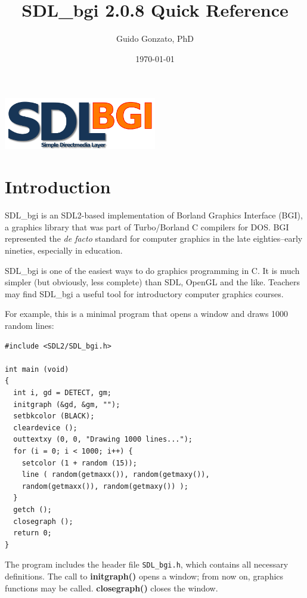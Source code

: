 \documentclass[a4paper,11pt]{article}
\newcommand{\SDLbgi}{SDL\_bgi}
\newcommand{\version}{2.0.8}        %
\newcommand{\func}[1]{\textbf{#1}}  %
\newcommand{\F}[1]{\texttt{#1}}     %
\begin{document}
\title{\SDLbgi{} \version{} Quick Reference}

\author{Guido Gonzato, PhD}

\date{\today}

\maketitle

\begin{center}
  \includegraphics[width=0.5\textwidth]{SDL_bgi_logo.png}  
\end{center}


\section{Introduction}

\SDLbgi{} is an SDL2-based implementation of Borland Graphics
Interface (BGI), a graphics library that was part of Turbo/Borland C
compilers for DOS. BGI represented the \emph{de facto} standard for
computer graphics in the late eighties--early nineties, especially in
education.

\SDLbgi{} is one of the easiest ways to do graphics programming in C.
It is much simpler (but obviously, less complete) than SDL, OpenGL and
the like. Teachers may find \SDLbgi{} a useful tool for introductory
computer graphics courses.

For example, this is a minimal program that opens a window and draws
1000 random lines:

\begin{small}
\begin{verbatim}
#include <SDL2/SDL_bgi.h>

int main (void)
{
  int i, gd = DETECT, gm;
  initgraph (&gd, &gm, "");
  setbkcolor (BLACK);
  cleardevice ();
  outtextxy (0, 0, "Drawing 1000 lines...");
  for (i = 0; i < 1000; i++) {
    setcolor (1 + random (15));
    line ( random(getmaxx()), random(getmaxy()),
    random(getmaxx()), random(getmaxy()) );
  }
  getch ();
  closegraph ();
  return 0;
}
\end{verbatim}
\end{small}

The program includes the header file \F{SDL\_bgi.h}, which contains
all necessary definitions. The call to \func{initgraph()} opens a
window; from now on, graphics functions may be called.
\func{closegraph()} closes the window.
 
\end{document}
